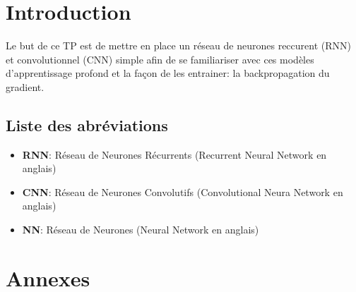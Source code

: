 \documentclass[a4paper, 12pt, openany]{book}
\makeatletter
\renewcommand\mainmatter{%
  \setlength{\parskip}{0pt}
  \pagenumbering{arabic}
  \pagestyle{empty}
  \@mainmattertrue}
\makeatother
\begin{document}
\tableofcontents 

\clearpage %

\frontmatter

\chapter{Introduction}
Le but de ce TP est de mettre en place un réseau de neurones reccurent (RNN) et convolutionnel (CNN) simple afin de se familiariser avec ces modèles d'apprentissage profond
et la façon de les entrainer: la backpropagation du gradient.

\section{Liste des abréviations} %
\begin{itemize}
  \item \textbf{RNN}: Réseau de Neurones Récurrents (Recurrent Neural Network en anglais)
  \item \textbf{CNN}: Réseau de Neurones Convolutifs (Convolutional Neura Network en anglais)
  \item \textbf{NN}: Réseau de Neurones (Neural Network en anglais)
\end{itemize}


\mainmatter



\newpage
\appendix
\titleformat{\chapter}[hang]{\LARGE\bfseries}{\textcolor{titlecolor}{}}{0.5em}{\textcolor{titlecolor}}
\chapter{Annexes}\label{annexe}


\end{document}

